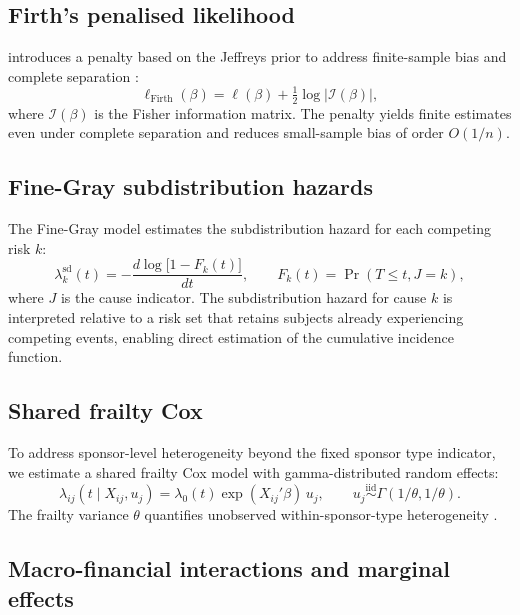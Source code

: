 \documentclass[11pt,a4paper]{article}
\begin{document}
\subsection{Firth's penalised likelihood}

\citet{Firth1993} introduces a penalty based on the Jeffreys prior to address finite-sample bias and complete separation \citep{HeinzeSchemper2002}:
\begin{equation}
  \ell_{\mathrm{Firth}}(\beta) = \ell(\beta) + \tfrac{1}{2}\log\bigl|\mathcal{I}(\beta)\bigr|,
  \label{eq:firth}
\end{equation}
where $\mathcal{I}(\beta)$ is the Fisher information matrix. The penalty yields finite estimates even under complete separation and reduces small-sample bias of order $O(1/n)$.

\subsection{Fine-Gray subdistribution hazards}

The Fine-Gray model \citep{FineGray1999} estimates the subdistribution hazard for each competing risk $k$:
\begin{equation}
  \lambda_k^{\mathrm{sd}}(t) = -\frac{d \log\bigl[1 - F_k(t)\bigr]}{dt}, \qquad F_k(t) = \Pr(T \leq t, J = k),
  \label{eq:fg}
\end{equation}
where $J$ is the cause indicator. The subdistribution hazard for cause $k$ is interpreted relative to a risk set that retains subjects already experiencing competing events, enabling direct estimation of the cumulative incidence function.

\subsection{Shared frailty Cox}

To address sponsor-level heterogeneity beyond the fixed sponsor type indicator, we estimate a shared frailty Cox model with gamma-distributed random effects:
\begin{equation}
  \lambda_{ij}(t \mid X_{ij}, u_j) = \lambda_0(t)\exp(X_{ij}'\beta)\, u_j, \qquad u_j \overset{\mathrm{iid}}{\sim} \Gamma(1/\theta, 1/\theta).
  \label{eq:frailty}
\end{equation}
The frailty variance $\theta$ quantifies unobserved within-sponsor-type heterogeneity \citep{TherneauGrambsch2003}.

\subsection{Macro-financial interactions and marginal effects}
\end{document}
